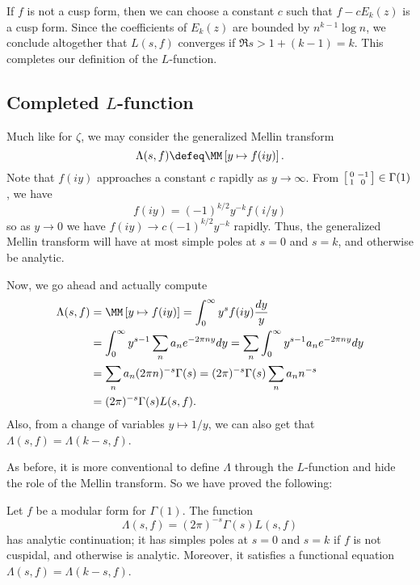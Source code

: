 If $f$ is not a cusp form,
then we can choose a constant $c$ such that
$f - c E_k(z)$ is a cusp form.
Since the coefficients of $E_k(z)$ are bounded by $n^{k-1} \log n$,
we conclude altogether that $L(s,f)$ converges if $\Re s > 1 + (k-1) = k$.
This completes our definition of the $L$-function.

\subsection{Completed $L$-function}
Much like for $\zeta$, we may consider the generalized Mellin transform
\[ \Lambda(s,f) \defeq \MM\left[ y \mapsto f(iy) \right]. \]
Note that $f(iy)$ approaches a constant $c$ rapidly as $y \to \infty$.
From
$\begin{bsmallmatrix} 0 & -1 \\ 1 & 0 \end{bsmallmatrix} \in \Gamma(1)$,
we have
\[ f(iy) = (-1)^{k/2} y^{-k} f(i/y) \]
so as $y \to 0$ we have $f(iy) \to c (-1)^{k/2} y^{-k}$ rapidly.
Thus, the generalized Mellin transform will have
at most simple poles at $s=0$ and $s=k$,
and otherwise be analytic.

Now, we go ahead and actually compute
\begin{align*}
  \Lambda(s,f) &= \MM\left[ y \mapsto f(iy) \right]
  = \int_0^\infty y^s f(iy) \frac{dy}{y} \\
  &= \int_0^\infty y^{s-1} \sum_n a_n e^{-2\pi n y} dy
  = \sum_n \int_0^\infty y^{s-1} a_n e^{-2\pi n y} dy \\
  &= \sum_n a_n (2\pi n)^{-s} \Gamma(s)
  = (2\pi)^{-s} \Gamma(s) \sum_n a_n n^{-s} \\
  &= (2\pi)^{-s} \Gamma(s) L(s,f).
\end{align*}
Also, from a change of variables $y \mapsto 1/y$,
we can also get that $\Lambda(s,f) = \Lambda(k-s, f)$.

As before, it is more conventional to define $\Lambda$
through the $L$-function and hide the role of the Mellin transform.
So we have proved the following:
\begin{theorem}
  Let $f$ be a modular form for $\Gamma(1)$.
  The function
  \[ \Lambda(s,f) = (2\pi)^{-s} \Gamma(s) L(s,f) \]
  has analytic continuation; it has simples poles at $s=0$ and $s=k$
  if $f$ is not cuspidal, and otherwise is analytic.
  Moreover, it satisfies a functional equation
  $\Lambda(s,f) = \Lambda(k-s,f)$.
\end{theorem}
